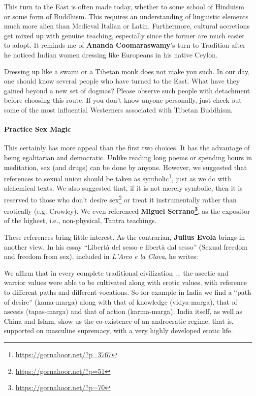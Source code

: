 This turn to the East is often made today, whether to some school of Hinduism or some form of Buddhism. This requires an understanding of linguistic elements much more alien than Medieval Italian or Latin. Furthermore, cultural accretions get mixed up with genuine teaching, especially since the former are much easier to adopt. It reminds me of \textbf{Ananda Coomaraswamy}'s turn to Tradition after he noticed Indian women dressing like Europeans in his native Ceylon.

Dressing up like a swami or a Tibetan monk does not make you such. In our day, one should know several people who have turned to the East. What have they gained beyond a new set of dogmas? Please observe such people with detachment before choosing this route. If you don't know anyone personally, just check out some of the most influential Westerners associated with Tibetan Buddhism.

\paragraph{Practice Sex Magic}

This certainly has more appeal than the first two choices. It has the advantage of being egalitarian and democratic. Unlike reading long poems or spending hours in meditation, sex (and drugs) can be done by anyone. However, we suggested that references to sexual union should be taken as symbolic\footnote{\url{https://gornahoor.net/?p=3767}}, just as we do with alchemical texts. We also suggested that, if it is not merely symbolic, then it is reserved to those who don't desire sex\footnote{\url{https://gornahoor.net/?p=51}} or treat it instrumentally rather than erotically (e.g. Crowley). We even referenced \textbf{Miguel Serrano\footnote{\url{https://gornahoor.net/?p=70}}}, as the expositor of the highest, i.e., non-physical, Tantra teachings.

These references bring little interest. As the contrarian, \textbf{Julius Evola} brings in another view. In his essay ``Libertà del sesso e libertà dal sesso'' (Sexual freedom and freedom from sex), included in \emph{L'Arco e la Clava}, he writes:

\begin{quotex}
We affirm that in every complete traditional civilization ... the ascetic and warrior values were able to be cultivated along with erotic values, with reference to different paths and different vocations. So for example in India we find a ``path of desire'' (kama-marga) along with that of knowledge (vidya-marga), that of ascesis (tapas-marga) and that of action (karma-marga). India itself, as well as China and Islam, show us the co-existence of an androcratic regime, that is, supported on masculine supremacy, with a very highly developed erotic life.
\end{quotex}


